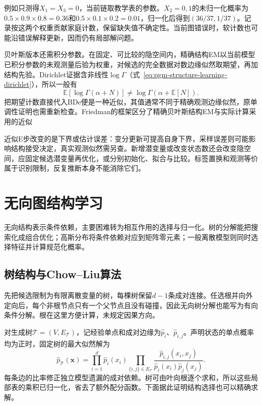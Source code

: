 例如只测得$X_1=X_3=0$，当前链取教学表的参数。$X_2=0,1$的未归一化概率为$0.5\times0.9\times0.8=0.36$和$0.5\times0.1\times0.2=0.01$，归一化后得到$(36/37,1/37)$。记录按这两个权重贡献家庭计数，保留缺失值不确定性。当前图错误时，软计数也可能沿错误解释更新，因而仍有局部解问题。

贝叶斯版本还需积分参数。在固定、可比较的隐空间内，精确结构EM以当前模型已积分参数的未观测量后验为权重，对候选的完全数据对数边缘似然取期望，再加结构先验。Dirichlet证据含非线性$\log\Gamma$（式~\eqref{eq:pgm-structure-learning-dirichlet}），所以一般有
\[
  \mathbb{E}[\log\Gamma(\alpha+N)]
  \ne\log\Gamma(\alpha+\mathbb{E}[N]).
\]
把期望计数直接代入BDe便是一种近似，其值通常不同于精确观测边缘似然，原单调性证明也需重新检查。Friedman的框架区分了精确贝叶斯结构EM与实际计算采用的近似

近似E步改变的是下界或估计误差：变分更新可提高自身下界，采样误差则可能影响结构接受决定，真实观测似然需另查。新增潜变量或改变状态数还会改变隐空间，应固定候选潜变量再优化，或分别初始化、拟合与比较。标签置换和观测等价属于识别限制，反复推断本身不能消除它们。

\section{无向图结构学习}
\label{sec:pgm-structure-learning-undirected}

无向结构表示条件依赖，主要困难转为相互作用的选择与归一化。树的分解能把搜索化成组合优化；高斯分布将条件依赖对应到矩阵零元素；一般离散模型则同时选择特征并计算规范化概率。

\subsection{树结构与Chow--Liu算法}
\label{sec:pgm-structure-learning-chow-liu}

先把候选限制为有限离散变量的树，每棵树保留$d-1$条成对连接。任选根并向外定向后，每个非根节点只有一个父节点且没有碰撞，因此无向树分解也能写为有向条件分解。根在这里方便计算，未规定因果方向。

对生成树$\mathcal{T}=(V,E_{\mathcal{T}})$，记经验单点和成对边缘为$\widehat p_i$、$\widehat p_{i,j}$。声明状态的单点概率均为正时，固定树的最大似然解为
\begin{equation}
  \widehat p_{\mathcal{T}}(\bm{x})
  =\prod_{i=1}^{d}\widehat p_i(x_i)
   \prod_{\{i,j\}\in E_{\mathcal{T}}}
     \frac{\widehat p_{i,j}(x_i,x_j)}
          {\widehat p_i(x_i)\widehat p_j(x_j)}.
  \label{eq:pgm-structure-learning-tree-factor}
\end{equation}
每条边的比率修正独立模型遗漏的成对依赖。树可由叶向根逐个求和，所以这些局部表的乘积已归一化，省去了额外配分函数。下面据此证明结构选择也可以精确求解。

